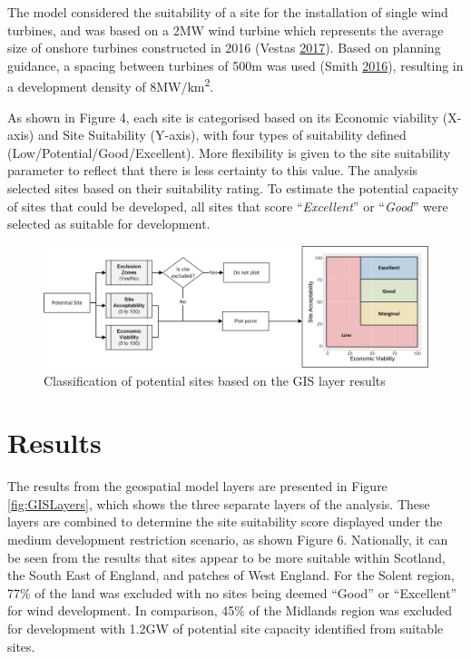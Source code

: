 \documentclass[a4paper,]{article}
\theoremstyle{definition}
\theoremstyle{definition}
\theoremstyle{remark}
\begin{document}
{The model considered the suitability of a site for the installation of
single wind turbines, and was based on a 2MW wind turbine which
represents the average size of onshore turbines constructed in 2016
(Vestas \protect\hyperlink{ref-Vesta2017}{2017}). Based on planning
guidance, a spacing between turbines of 500m was used (Smith
\protect\hyperlink{ref-Smith2016}{2016}), resulting in a development
density of 8MW/km\textsuperscript{2}.

As shown in Figure 4, each site is categorised based on its Economic
viability (X-axis) and Site Suitability (Y-axis), with four types of
suitability defined (Low/Potential/Good/Excellent). More flexibility is
given to the site suitability parameter to reflect that there is less
certainty to this value. The analysis selected sites based on their
suitability rating. To estimate the potential capacity of sites that
could be developed, all sites that score ``\emph{Excellent}'' or
``\emph{Good}'' were selected as suitable for development.

\begin{figure}[!h]
\includegraphics[width=1\linewidth]{figures/GIS Plot V2} \caption{Classification of potential sites based on the GIS layer results}\label{fig:SiteProcess}
\end{figure}

\section{Results}\label{results}

The results from the geospatial model layers are presented in Figure
\ref{fig:GISLayers}, which shows the three separate layers of the
analysis. These layers are combined to determine the site suitability
score displayed under the medium development restriction scenario, as
shown Figure 6. Nationally, it can be seen from the results that sites
appear to be more suitable within Scotland, the South East of England,
and patches of West England. For the Solent region, 77\% of the land was
excluded with no sites being deemed ``Good'' or ``Excellent'' for wind
development. In comparison, 45\% of the Midlands region was excluded for
development with 1.2GW of potential site capacity identified from
suitable sites.

}
\end{document}
